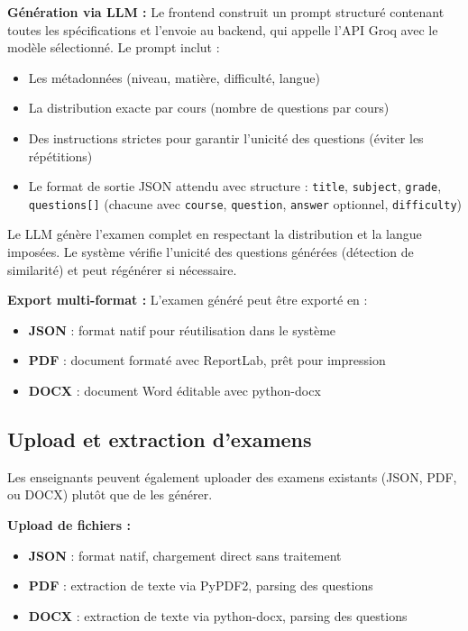 \textbf{Génération via LLM :}
Le frontend construit un prompt structuré contenant toutes les spécifications et l'envoie au backend, qui appelle l'API Groq avec le modèle sélectionné. Le prompt inclut :
\begin{itemize}
    \item Les métadonnées (niveau, matière, difficulté, langue)
    \item La distribution exacte par cours (nombre de questions par cours)
    \item Des instructions strictes pour garantir l'unicité des questions (éviter les répétitions)
    \item Le format de sortie JSON attendu avec structure : \texttt{title}, \texttt{subject}, \texttt{grade}, \texttt{questions[]} (chacune avec \texttt{course}, \texttt{question}, \texttt{answer} optionnel, \texttt{difficulty})
\end{itemize}

Le LLM génère l'examen complet en respectant la distribution et la langue imposées. Le système vérifie l'unicité des questions générées (détection de similarité) et peut régénérer si nécessaire.

\textbf{Export multi-format :}
L'examen généré peut être exporté en :
\begin{itemize}
    \item \textbf{JSON} : format natif pour réutilisation dans le système
    \item \textbf{PDF} : document formaté avec ReportLab, prêt pour impression
    \item \textbf{DOCX} : document Word éditable avec python-docx
\end{itemize}

\subsection{Upload et extraction d'examens}

Les enseignants peuvent également uploader des examens existants (JSON, PDF, ou DOCX) plutôt que de les générer.

\textbf{Upload de fichiers :}
\begin{itemize}
    \item \textbf{JSON} : format natif, chargement direct sans traitement
    \item \textbf{PDF} : extraction de texte via PyPDF2, parsing des questions
    \item \textbf{DOCX} : extraction de texte via python-docx, parsing des questions
\end{itemize}

